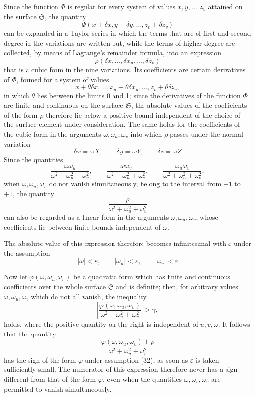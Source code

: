 \documentclass[11pt,a4paper,leqno]{article}
\begin{document}
Since the function $\Phi$ is regular for every system of values
$x,y,\ldots,z_v$ attained on the surface $\mathfrak{S}$, the quantity
\[
\Phi(x+\delta x,y+\delta y,\ldots,z_v+\delta z_v)
\]
can be expanded in a Taylor series in which the terms that are of first and
second degree in the variations are written out, while the terms of higher
degree are collected, by means of Lagrange's remainder formula, into an
expression
\[
\rho(\delta x,\ldots,\delta x_u,\ldots,\delta z_v)
\]
that is a cubic form in the nine variations. Its coefficients are certain
derivatives of $\Phi$, formed for a system of values
\[
x+\theta\delta x,\ldots,x_u+\theta\delta x_u,\ldots,
z_v+\theta\delta z_v,
\]
in which $\theta$ lies between the limits 0 and 1; since the derivatives of
the function $\Phi$ are finite and continuous on the surface
$\mathfrak{S}$, the absolute values of the coefficients of the form $\rho$
therefore lie below a positive bound independent of the choice of the surface
element under consideration. The same holds for the coefficients of the
cubic form in the arguments $\omega,\omega_u,\omega_v$ into which $\rho$
passes under the normal variation
\begin{equation}\tag{31}
\delta x=\omega X,\qquad \delta y=\omega Y,\qquad \delta z=\omega Z
\end{equation}
Since the quantities
\[
\frac{\omega\omega_u}{\omega^2+\omega_u^2+\omega_v^2},\qquad
\frac{\omega\omega_v}{\omega^2+\omega_u^2+\omega_v^2},\qquad
\frac{\omega_u\omega_v}{\omega^2+\omega_u^2+\omega_v^2},
\]
when $\omega,\omega_u,\omega_v$ do not vanish simultaneously, belong to the
interval from $-1$ to $+1$, the quantity
\[
\frac{\rho}{\omega^2+\omega_u^2+\omega_v^2}
\]
can also be regarded as a linear form in the arguments
$\omega,\omega_u,\omega_v$, whose coefficients lie between finite bounds
independent of $\omega$.

The absolute value of this expression therefore becomes infinitesimal with
$\varepsilon$ under the assumption
\begin{equation}\tag{32}
|\omega|<\varepsilon,\qquad |\omega_u|<\varepsilon,\qquad
|\omega_v|<\varepsilon
\end{equation}

Now let $\varphi(\omega,\omega_u,\omega_v)$ be a quadratic form which has
finite and continuous coefficients over the whole surface $\mathfrak{S}$ and
is definite; then, for arbitrary values $\omega,\omega_u,\omega_v$ which do
not all vanish, the inequality
\[
\left|\frac{\varphi(\omega,\omega_u,\omega_v)}
{\omega^2+\omega_u^2+\omega_v^2}\right|>\gamma,
\]
holds, where the positive quantity on the right is independent of
$u,v,\omega$. It follows that the quantity
\[
\frac{\varphi(\omega,\omega_u,\omega_v)+\rho}
{\omega^2+\omega_u^2+\omega_v^2}
\]
has the sign of the form $\varphi$ under assumption (32), as soon as
$\varepsilon$ is taken sufficiently small. The numerator of this expression
therefore never has a sign different from that of the form $\varphi$, even
when the quantities $\omega,\omega_u,\omega_v$ are permitted to vanish
simultaneously.
\end{document}
